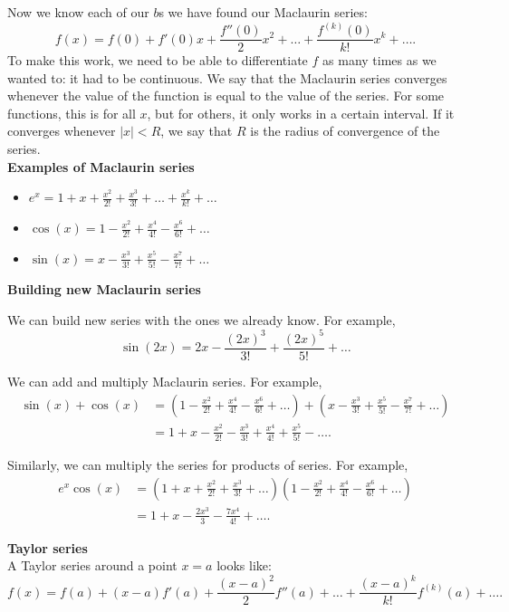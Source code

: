 \documentclass[10pt, a4paper]{article}
\begin{document}
Now we know each of our $b$s we have found our Maclaurin series:
\[
f(x) = f(0) + f'(0)x + \frac{f''(0)}{2}x ^ 2 + \dots + \frac{f^{(k)}(0)}{k!}x ^ k + \dotsc.
\]
To make this work, we need to be able to differentiate $f$ as many times as we wanted to: it had to be continuous. We say that the Maclaurin series converges whenever the value of the function is equal to the value of the series. For some functions, this is for all $x$, but for others, it only works in a certain interval. If it converges whenever $|x| < R$, we say that $R$ is the radius of convergence of the series.
\\

\textbf{Examples of Maclaurin series}

\begin{itemize}
    \item $e ^ x = 1 + x + \frac{x ^ 2}{2!} + \frac{x ^ 3}{3!} + \dots + \frac{x ^ k}{k!} + \dotsc$
    \item $\cos(x) = 1 - \frac{x ^ 2}{2!} + \frac{x ^ 4}{4!} - \frac{x ^ 6}{6!} + \dotsc$
    \item $\sin(x) = x - \frac{x ^ 3}{3!} + \frac{x ^ 5}{5!} - \frac{x ^ 7}{7!} + \dotsc$
\end{itemize}

\textbf{Building new Maclaurin series}

We can build new series with the ones we already know. For example,
\[
\sin(2x) = 2x - \frac{(2x) ^ 3}{3!} + \frac{(2x) ^ 5}{5!} + \dotsc
\]

We can add and multiply Maclaurin series. For example,
\begin{align*}
    \sin(x) + \cos(x) &= \left(1 - \frac{x ^ 2}{2!} + \frac{x ^ 4}{4!} - \frac{x ^ 6}{6!} + \dotsc\right) + \left(x - \frac{x ^ 3}{3!} + \frac{x ^ 5}{5!} - \frac{x ^ 7}{7!} + \dotsc\right) \\
    &= 1 + x - \frac{x ^ 2}{2!} - \frac{x ^ 3}{3!} + \frac{x ^ 4}{4!} + \frac{x ^ 5}{5!} - \dotsc.
\end{align*}

Similarly, we can multiply the series for products of series. For example,
\begin{align*}
    e ^ x \cos(x) &= \left(1 + x + \frac{x ^ 2}{2!} + \frac{x ^ 3}{3!} + \dotsc\right) \left(1 - \frac{x ^ 2}{2!} + \frac{x ^ 4}{4!} - \frac{x ^ 6}{6!} + \dotsc\right) \\
    &= 1 + x - \frac{2x ^ 3}{3} - \frac{7x ^ 4}{4!} + \dotsc.
\end{align*}

\textbf{Taylor series} \\
A Taylor series around a point $x = a$ looks like:
\[
f(x) = f(a) + (x - a)f'(a) + \frac{(x - a) ^ 2}{2}f''(a) + \dots + \frac{(x - a) ^ k}{k!}f^{(k)}(a) + \dotsc.
\]
\end{document}
